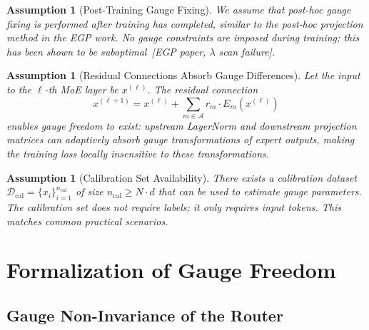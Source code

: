 \documentclass[12pt,a4paper]{article}
\newtheorem{assumption_env}[theorem]{Assumption}
\theoremstyle{remark}
\newcommand{\D}{\mathcal{D}}
\begin{document}
\begin{assumption_env}[Post-Training Gauge Fixing]\label{ass:posthoc}
We assume that post-hoc gauge fixing is performed after training has completed, similar to the post-hoc projection method in the EGP work. No gauge constraints are imposed during training; this has been shown to be suboptimal~[EGP paper, $\lambda$ scan failure].
\end{assumption_env}

\begin{assumption_env}[Residual Connections Absorb Gauge Differences]\label{ass:residual}
Let the input to the $\ell$-th MoE layer be $x^{(\ell)}$. The residual connection
\begin{equation}
    x^{(\ell+1)} = x^{(\ell)} + \sum_{m \in \mathcal{A}} r_m \cdot E_m(x^{(\ell)})
\end{equation}
enables gauge freedom to exist: upstream LayerNorm and downstream projection matrices can adaptively absorb gauge transformations of expert outputs, making the training loss locally insensitive to these transformations.
\end{assumption_env}

\begin{assumption_env}[Calibration Set Availability]\label{ass:calibration}
There exists a calibration dataset $\D_{\text{cal}} = \{x_i\}_{i=1}^{n_{\text{cal}}}$ of size $n_{\text{cal}} \geq N \cdot d$ that can be used to estimate gauge parameters. The calibration set does not require labels; it only requires input tokens. This matches common practical scenarios.
\end{assumption_env}

\section{Formalization of Gauge Freedom}

\subsection{Gauge Non-Invariance of the Router}
\end{document}
